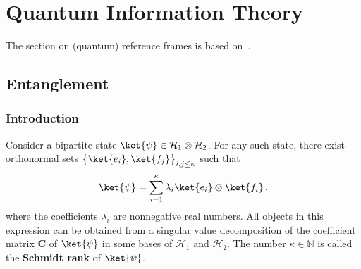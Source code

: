 \chapter{Quantum Information Theory}\label{chapter:quantum_computing}

    The section on (quantum) reference frames is based on~\citet{de_la_hamette_quantum_2020}.

    \minitoc

\section{Entanglement}
\subsection{Introduction}

    \begin{construct}
        Consider a bipartite state $\ket{\psi}\in\mathcal{H}_1\otimes\mathcal{H}_2$. For any such state, there exist orthonormal sets $\bigl\{\ket{e_i},\ket{f_j}\bigr\}_{i,j\leq\kappa}$ such that
        \begin{gather}
            \ket{\psi} = \sum_{i=1}^\kappa\lambda_i\ket{e_i}\otimes\ket{f_i}\,,
        \end{gather}
        where the coefficients $\lambda_i$ are nonnegative real numbers. All objects in this expression can be obtained from a singular value decomposition of the coefficient matrix $\mathbf{C}$ of $\ket{\psi}$ in some bases of $\mathcal{H}_1$ and $\mathcal{H}_2$. The number $\kappa\in\mathbb{N}$ is called the \textbf{Schmidt rank} of $\ket{\psi}$.
    \end{construct}


